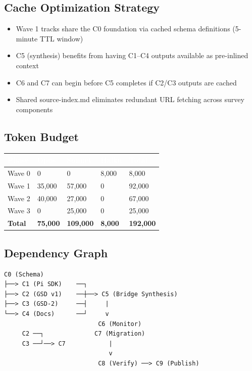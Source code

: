 \documentclass[11pt,letterpaper]{article}
\newcommand{\tableheader}[1]{\textbf{\sffamily\textcolor{white}{#1}}}
\begin{document}
\subsection{Cache Optimization Strategy}

\begin{itemize}[leftmargin=2em]
\item Wave 1 tracks share the C0 foundation via cached schema definitions (5-minute TTL window)
\item C5 (synthesis) benefits from having C1--C4 outputs available as pre-inlined context
\item C6 and C7 can begin before C5 completes if C2/C3 outputs are cached
\item Shared source-index.md eliminates redundant URL fetching across survey components
\end{itemize}

\subsection{Token Budget}

\begin{center}
\begin{tabularx}{\textwidth}{L{3cm}C{2cm}C{2cm}C{2cm}C{2cm}}
\toprule
{}
\tableheader{Phase} & \tableheader{Opus} & \tableheader{Sonnet} & \tableheader{Haiku} & \tableheader{Total} \\
\midrule
Wave 0 & 0 & 0 & 8,000 & 8,000 \\
Wave 1 & 35,000 & 57,000 & 0 & 92,000 \\
Wave 2 & 40,000 & 27,000 & 0 & 67,000 \\
Wave 3 & 0 & 25,000 & 0 & 25,000 \\
\midrule
\textbf{Total} & \textbf{75,000} & \textbf{109,000} & \textbf{8,000} & \textbf{192,000} \\
\bottomrule
\end{tabularx}
\end{center}

\subsection{Dependency Graph}

\begin{asciibox}
\begin{verbatim}
C0 (Schema)
├──> C1 (Pi SDK)    ──┐
├──> C2 (GSD v1)    ──┼──> C5 (Bridge Synthesis)
├──> C3 (GSD-2)     ──┤     |
└──> C4 (Docs)      ──┘     v
                          C6 (Monitor)
     C2 ──┐              C7 (Migration)
     C3 ──┘──> C7            |
                             v
                          C8 (Verify) ──> C9 (Publish)
\end{verbatim}
\end{asciibox}
\end{document}
